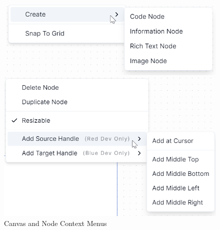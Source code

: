 \begin{figure}[h]
    \centering
    \begin{minipage}{0.45\textwidth}
        \centering
        \includegraphics[width=1\linewidth]{images/canvas-context-menu.png}
    \end{minipage}%
    \hspace{0.1\textwidth}%
    \begin{minipage}{0.45\textwidth}
        \centering
        \includegraphics[width=1\linewidth]{images/node-context-menu.png}
    \end{minipage}
    \caption{Canvas and Node Context Menus}
    \label{fig:context-menus}
\end{figure}

